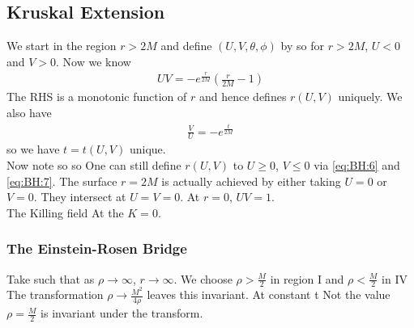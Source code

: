 \documentclass{article}
\begin{document}
\subsection{Kruskal Extension}
We start in the region $r>2M$ and define  $(U,V,\theta,\phi)$ by 
so for $r>2M$, $U<0$ and $V>0$. Now we know 
\begin{align}
\label{eq:BH:6}
UV = -e^{\frac{r}{2M}}(\frac{r}{2M}-1)
\end{align}
The RHS is a monotonic function of $r$ and hence defines $r(U,V)$ uniquely. We also have 
\begin{align}
\label{eq:BH:7}
\frac{V}{U} = -e^\frac{t}{2M}
\end{align}
so we have $t=t(U,V)$ unique. \\
Now note 
so 
so 
One can still define $r(U,V)$ to $U\geq0$, $V\leq0$ via \ref{eq:BH:6} and \ref{eq:BH:7}. The surface $r=2M$ is actually achieved by either taking $U=0$ or $V=0$. They intersect at $U=V=0$. At $r=0$, $UV=1$. \\
The Killing field
At the  $K=0$. 

\subsubsection*{The Einstein-Rosen Bridge}
Take 
such that as $\rho \to \infty $, $r \to \infty$. We choose $\rho>\frac{M}{2}$ in region I and $\rho < \frac{M}{2}$ in IV
The transformation $\rho \to \frac{M^2}{4\rho}$ leaves this invariant. At constant t 
Not the value $\rho=\frac{M}{2}$ is invariant under the transform. 
\end{document}
